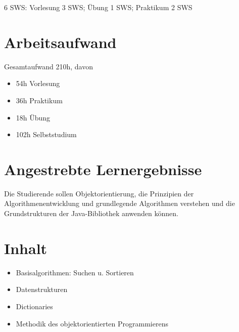 6 SWS: Vorlesung 3 SWS; Übung 1 SWS; Praktikum 2 SWS

\hypertarget{arbeitsaufwandpathlabel....srcmodulbeschreibungen-bachelor-bpo5ba_algorithmenundprogrammierung2}{%
\section*{Arbeitsaufwand\label{../../src/modulbeschreibungen-bachelor-bpo5/BA_AlgorithmenundProgrammierung2}}\label{arbeitsaufwandpathlabel....srcmodulbeschreibungen-bachelor-bpo5ba_algorithmenundprogrammierung2}}

Gesamtaufwand 210h, davon

\begin{itemize}
\tightlist
\item
  54h Vorlesung
\item
  36h Praktikum
\item
  18h Übung
\item
  102h Selbststudium
\end{itemize}

\hypertarget{angestrebte-lernergebnissepathlabel....srcmodulbeschreibungen-bachelor-bpo5ba_algorithmenundprogrammierung2}{%
\section*{Angestrebte
Lernergebnisse\label{../../src/modulbeschreibungen-bachelor-bpo5/BA_AlgorithmenundProgrammierung2}}\label{angestrebte-lernergebnissepathlabel....srcmodulbeschreibungen-bachelor-bpo5ba_algorithmenundprogrammierung2}}

Die Studierende sollen Objektorientierung, die Prinzipien der
Algorithmenentwicklung und grundlegende Algorithmen verstehen und die
Grundstrukturen der Java-Bibliothek anwenden können.

\hypertarget{inhaltpathlabel....srcmodulbeschreibungen-bachelor-bpo5ba_algorithmenundprogrammierung2}{%
\section*{Inhalt\label{../../src/modulbeschreibungen-bachelor-bpo5/BA_AlgorithmenundProgrammierung2}}\label{inhaltpathlabel....srcmodulbeschreibungen-bachelor-bpo5ba_algorithmenundprogrammierung2}}

\begin{itemize}
\tightlist
\item
  Basisalgorithmen: Suchen u. Sortieren
\item
  Datenstrukturen
\item
  Dictionaries
\item
  Methodik des objektorientierten Programmierens
\end{itemize}

